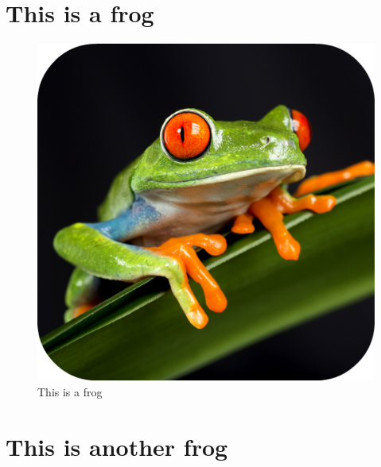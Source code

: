 \begin{apendicesenv}
\partapendices

\chapter{This is a frog}
\label{appendix:frog}
\begin{figure}[H]
    \centering
    \includegraphics[width=1\textwidth]{figuras/Frog.png}
    \caption{This is a frog}
    \label{fig:frog}
\end{figure}

\chapter{This is another frog}


\end{apendicesenv}
